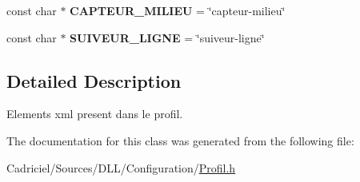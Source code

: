 \begin{DoxyCompactItemize}
\item 
const char $\ast$ {\bfseries C\+A\+P\+T\+E\+U\+R\+\_\+\+M\+I\+L\+I\+EU} = \char`\"{}capteur-\/milieu\char`\"{}\hypertarget{class_element_x_m_l_afabee63df68fdc76659daf355836ba59}{}\label{class_element_x_m_l_afabee63df68fdc76659daf355836ba59}

\item 
const char $\ast$ {\bfseries S\+U\+I\+V\+E\+U\+R\+\_\+\+L\+I\+G\+NE} = \char`\"{}suiveur-\/ligne\char`\"{}\hypertarget{class_element_x_m_l_ab643094b200c13137c2c791c92e36ff6}{}\label{class_element_x_m_l_ab643094b200c13137c2c791c92e36ff6}

\end{DoxyCompactItemize}


\subsection{Detailed Description}
Elements xml present dans le profil. 

The documentation for this class was generated from the following file\+:\begin{DoxyCompactItemize}
\item 
Cadriciel/\+Sources/\+D\+L\+L/\+Configuration/\hyperlink{_profil_8h}{Profil.\+h}\end{DoxyCompactItemize}
